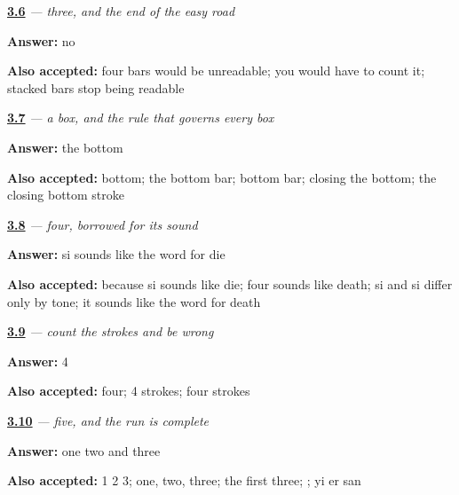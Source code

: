 \noindent\begin{minipage}[t]{\linewidth}
\raggedright
\hyperlink{review-ZH-C03-san-next}{\textbf{3.6}} \emph{ — three, and the end of the easy road}\par
\small \textbf{Answer:} no\par
\footnotesize \textbf{Also accepted:} four bars would be unreadable; you would have to count it; stacked bars stop being readable
\end{minipage}\par\medskip

\noindent\begin{minipage}[t]{\linewidth}
\raggedright
\hyperlink{review-ZH-W03-si-last}{\textbf{3.7}} \emph{ — a box, and the rule that governs every box}\par
\small \textbf{Answer:} the bottom\par
\footnotesize \textbf{Also accepted:} bottom; the bottom bar; bottom bar; closing the bottom; the closing bottom stroke
\end{minipage}\par\medskip

\noindent\begin{minipage}[t]{\linewidth}
\raggedright
\hyperlink{review-ZH-C03-si-tone}{\textbf{3.8}} \emph{ — four, borrowed for its sound}\par
\small \textbf{Answer:} si sounds like the word for die\par
\footnotesize \textbf{Also accepted:} because si sounds like die; four sounds like death; si and si differ only by tone; it sounds like the word for death
\end{minipage}\par\medskip

\noindent\begin{minipage}[t]{\linewidth}
\raggedright
\hyperlink{review-ZH-W03-wu-strokes}{\textbf{3.9}} \emph{ — count the strokes and be wrong}\par
\small \textbf{Answer:} 4\par
\footnotesize \textbf{Also accepted:} four; 4 strokes; four strokes
\end{minipage}\par\medskip

\noindent\begin{minipage}[t]{\linewidth}
\raggedright
\hyperlink{review-ZH-C03-wu-derive}{\textbf{3.10}} \emph{ — five, and the run is complete}\par
\small \textbf{Answer:} one two and three\par
\footnotesize \textbf{Also accepted:} 1 2 3; one, two, three; the first three; ; yi er san
\end{minipage}\par\medskip

